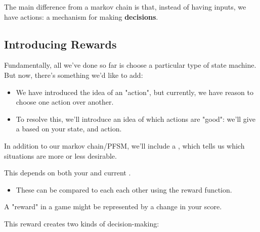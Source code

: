 
        The main difference from a markov chain is that, instead of having inputs, we have actions: a mechanism for making \textbf{decisions}.

        

    \pagebreak
    \subsection{Introducing Rewards}

        Fundamentally, all we've done so far is choose a particular type of state machine. But now, there's something we'd like to add:

        \begin{itemize}
            \item We have introduced the idea of an "action", but currently, we have reason to choose one action over another.
            \item To resolve this, we'll introduce an idea of which actions are "good": we'll give a  based on your state, and action.\\
        \end{itemize}

        \begin{concept}
            In addition to our markov chain/PFSM, we'll include a , which tells us which situations are more or less desirable.

            This depends on both your  and current . 
            
            \begin{itemize}
                \item These  can be compared to each each other using the reward function.
            \end{itemize}
        \end{concept}

        \miniex A "reward" in a game might be represented by a change in your score.

        

        This reward creates two kinds of decision-making:\\

